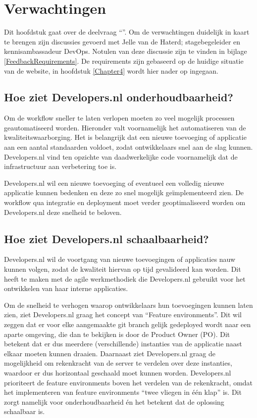 \chapter{Verwachtingen}

\label{Verwachtingen}

Dit hoofdstuk gaat over de deelvraag \enquote{\deelverwachtingen}. Om de verwachtingen duidelijk in kaart te brengen zijn discussies gevoerd met Jelle van de Haterd; stagebegeleider en kennisambassadeur DevOps. Notulen van deze discussie zijn te vinden in bijlage \ref{FeedbackRequirements}. De requirements zijn gebaseerd op de huidige situatie van de website, in hoofdstuk \ref{Chapter4} wordt hier nader op ingegaan.

\section{Hoe ziet Developers.nl onderhoudbaarheid?}

Om de workflow sneller te laten verlopen moeten zo veel mogelijk processen geautomatiseerd worden. Hieronder valt voornamelijk het automatiseren van de kwaliteitswaarborging. Het is belangrijk dat een nieuwe toevoeging of applicatie aan een aantal standaarden voldoet, zodat ontwikkelaars snel aan de slag kunnen. Developers.nl vind ten opzichte van daadwerkelijke code voornamelijk dat de infrastructuur aan verbetering toe is.

Developers.nl wil een nieuwe toevoeging of eventueel een volledig nieuwe applicatie kunnen bedenken en deze zo snel mogelijk geïmplementeerd zien. De workflow qua integratie en deployment moet verder geoptimaliseerd worden om Developers.nl deze snelheid te beloven.

\section{Hoe ziet Developers.nl schaalbaarheid?}

Developers.nl wil de voortgang van nieuwe toevoegingen of applicaties nauw kunnen volgen, zodat de kwaliteit hiervan op tijd gevalideerd kan worden. Dit heeft te maken met de agile werkmethodiek die Developers.nl gebruikt voor het ontwikkelen van haar interne applicaties.

Om de snelheid te verhogen waarop ontwikkelaars hun toevoegingen kunnen laten zien, ziet Developers.nl graag het concept van \enquote{Feature environments}. Dit wil zeggen dat er voor elke aangemaakte git branch gelijk gedeployed wordt naar een aparte omgeving, die dan te bekijken is door de Product Owner (PO). Dit betekent dat er dus meerdere (verschillende) instanties van de applicatie naast elkaar moeten kunnen draaien. Daarnaast ziet Developers.nl graag de mogelijkheid om rekenkracht van de server te verdelen over deze instanties, waardoor er dus horizontaal geschaald moet kunnen worden. Developers.nl prioriteert de feature environments boven het verdelen van de rekenkracht, omdat het implementeren van feature environments \enquote{twee vliegen in één klap} is. Dit zorgt namelijk voor onderhoudbaarheid én het betekent dat de oplossing schaalbaar is.


